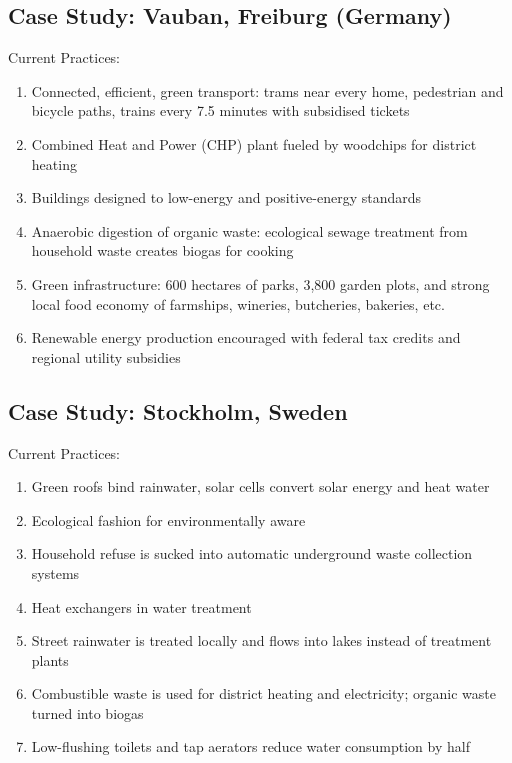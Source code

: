 \documentclass[12pt, a4paper]{article}
\begin{document}
\begin{multicols*}{3}
\colbreak
\subsection{Case Study: Vauban, Freiburg (Germany)}
Current Practices:
\begin{enumerate}[\roman*.]
  \item Connected, efficient, green transport: trams near every home, pedestrian and bicycle paths, trains every 7.5 minutes with subsidised tickets
  \item Combined Heat and Power (CHP) plant fueled by woodchips for district heating
  \item Buildings designed to low-energy and positive-energy standards 
  \item Anaerobic digestion of organic waste: ecological sewage treatment from household waste creates biogas for cooking
  \item Green infrastructure: 600 hectares of parks, 3,800 garden plots, and strong local food economy of farmships, wineries, butcheries, bakeries, etc.
  \item Renewable energy production encouraged with federal tax credits and regional utility subsidies
\end{enumerate}

\subsection{Case Study: Stockholm, Sweden}
Current Practices:
\begin{enumerate}[\roman*.]
  \item Green roofs bind rainwater, solar cells convert solar energy and heat water 
  \item Ecological fashion for environmentally aware 
  \item Household refuse is sucked into automatic underground waste collection systems
  \item Heat exchangers in water treatment 
  \item Street rainwater is treated locally and flows into lakes instead of treatment plants 
  \item Combustible waste is used for district heating and electricity; organic waste turned into biogas 
  \item Low-flushing toilets and tap aerators reduce water consumption by half
\end{enumerate}

\colbreak

\end{multicols*}
\end{document}

